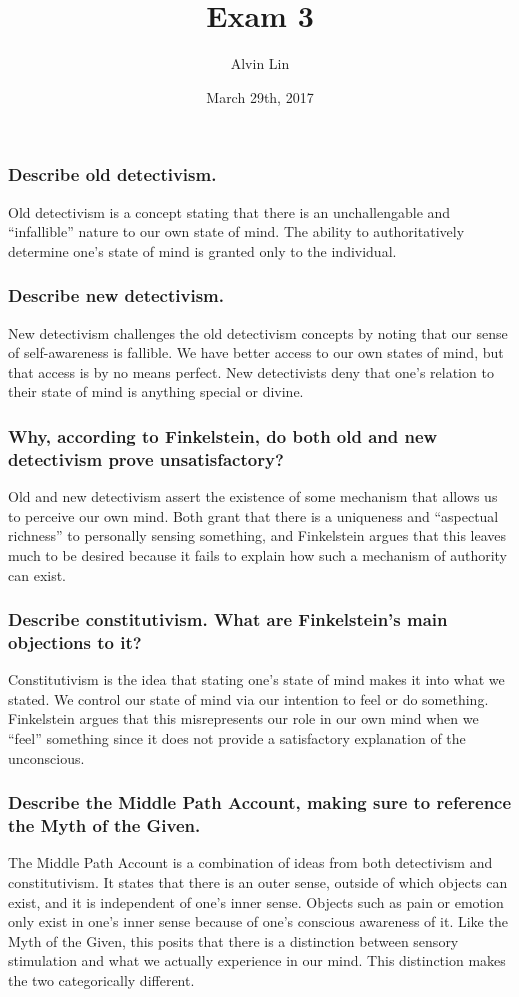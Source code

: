 \documentclass[letterpaper, 12pt]{article}
\title{Exam 3}
\author{Alvin Lin}
\date{March 29th, 2017}
\begin{document}
\maketitle

\subsubsection*{Describe old detectivism.}
Old detectivism is a concept stating that there is an unchallengable and
``infallible'' nature to our own state of mind. The ability to
authoritatively determine one's state of mind is granted only to the
individual.

\subsubsection*{Describe new detectivism.}
New detectivism challenges the old detectivism concepts by noting that our
sense of self-awareness is fallible. We have better access to our own states
of mind, but that access is by no means perfect. New detectivists deny that
one's relation to their state of mind is anything special or divine.

\subsubsection*{Why, according to Finkelstein, do both old and new detectivism
prove unsatisfactory?}
Old and new detectivism assert the existence of some mechanism that allows us
to perceive our own mind. Both grant that there is a uniqueness and
``aspectual richness'' to personally sensing something, and Finkelstein
argues that this leaves much to be desired because it fails to explain how such
a mechanism of authority can exist.

\subsubsection*{Describe constitutivism. What are Finkelstein’s main objections
to it?}
Constitutivism is the idea that stating one's state of mind makes it into what
we stated. We control our state of mind via our intention to feel or do
something. Finkelstein argues that this misrepresents our role in our own mind
when we ``feel'' something since it does not provide a satisfactory explanation
of the unconscious.

\subsubsection*{Describe the Middle Path Account, making sure to reference the
Myth of the Given.}
The Middle Path Account is a combination of ideas from both detectivism and
constitutivism. It states that there is an outer sense, outside of which
objects can exist, and it is independent of one's inner sense. Objects such
as pain or emotion only exist in one's inner sense because of one's conscious
awareness of it. Like the Myth of the Given, this posits that there is a
distinction between sensory stimulation and what we actually experience in
our mind. This distinction makes the two categorically different.
\end{document}
